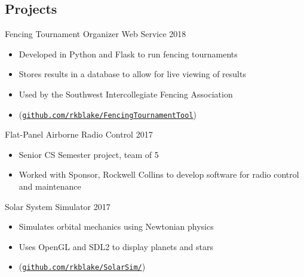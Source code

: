 \documentclass[line,margin]{res}
\begin{document}
\begin{resume}
\vspace{-4pt}
\section{Projects}
\vspace{12pt}


Fencing Tournament Organizer Web Service
\hfill 2018
	\begin{itemize} \itemsep -2pt
		\item Developed in Python and Flask to run fencing tournaments
		\item Stores results in a database to allow for live viewing of results
		\item Used by the Southwest Intercollegiate Fencing Association
		\item (\href{https://github.com/rkblake/FencingTournamentTool}{\texttt{github.com/rkblake/FencingTournamentTool}})
	\end{itemize}

\vspace{-8pt}
Flat-Panel Airborne Radio Control
\hfill 2017
	\begin{itemize} \itemsep -2pt
		\item Senior CS Semester project, team of 5
		\item Worked with Sponsor, Rockwell Collins to develop software for radio control and maintenance
	\end{itemize}

\vspace{-8pt}
Solar System Simulator
\hfill 2017
	\begin{itemize} \itemsep -2pt
		\item Simulates orbital mechanics using Newtonian physics
		\item Uses OpenGL and SDL2 to display planets and stars
		\item (\href{https://github.com/rkblake/SolarSim/}{\texttt{github.com/rkblake/SolarSim/}})
	\end{itemize}


\end{resume}
\end{document}
